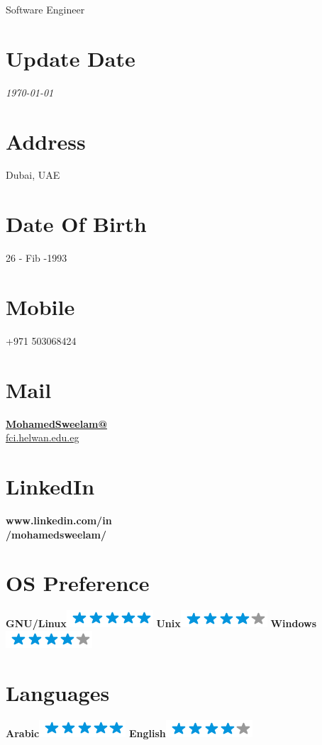 \documentclass[]{friggeri-cv}
\begin{document}
	
      {Software Engineer}
      

\begin{aside}
  \section{Update Date}
	\emph{\today} 
    ~
  \section{Address}
    Dubai, UAE
    ~
  \section{Date Of Birth}
    26 - Fib -1993
    ~
  \section{Mobile}
    +971 503068424
    ~
  \section{Mail}
    \href{mailto:MohamedSweelam@fci.helwan.edu.eg}{\textbf{MohamedSweelam@}\\fci.helwan.edu.eg}
    ~
  \section{LinkedIn}
    \textbf{www.linkedin.com/in\\/mohamedsweelam/}
    ~
  \section{OS Preference}
    \textbf{GNU/Linux}\includegraphics[scale=0.40]{img/5stars.png}
    \textbf{Unix}\includegraphics[scale=0.40]{img/4stars.png}
    \textbf{Windows}\includegraphics[scale=0.40]{img/4stars.png}
    ~
  \section{Languages}
    \textbf{Arabic}\includegraphics[scale=0.40]{img/5stars.png}
    \textbf{English}\includegraphics[scale=0.40]{img/4stars.png}
    ~

\end{aside}
\end{document}
